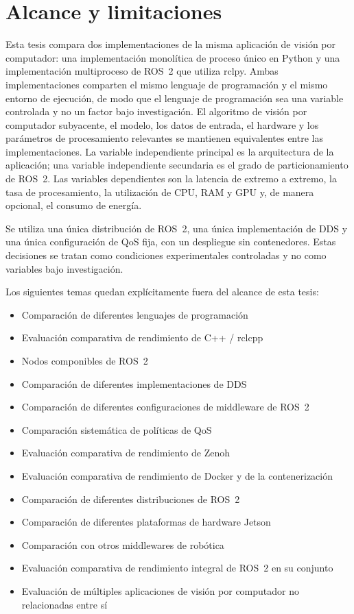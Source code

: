 \section{Alcance y limitaciones}
\label{sec:scope}

Esta tesis compara dos implementaciones de la misma aplicación de visión
por computador: una implementación monolítica de proceso único en Python y
una implementación multiproceso de ROS~2 que utiliza rclpy. Ambas
implementaciones comparten el mismo lenguaje de programación y el mismo
entorno de ejecución, de modo que el lenguaje de programación sea una
variable controlada y no un factor bajo investigación. El algoritmo de
visión por computador subyacente, el modelo, los datos de entrada, el
hardware y los parámetros de procesamiento relevantes se mantienen
equivalentes entre las implementaciones. La variable independiente principal
es la arquitectura de la aplicación; una variable independiente secundaria
es el grado de particionamiento de ROS~2. Las variables dependientes son la
latencia de extremo a extremo, la tasa de procesamiento, la utilización de
CPU, RAM y GPU y, de manera opcional, el consumo de energía.

Se utiliza una única distribución de ROS~2, una única implementación de DDS
y una única configuración de QoS fija, con un despliegue sin contenedores.
Estas decisiones se tratan como condiciones experimentales controladas y no
como variables bajo investigación.

Los siguientes temas quedan explícitamente fuera del alcance de esta tesis:

\begin{itemize}
  \item Comparación de diferentes lenguajes de programación
  \item Evaluación comparativa de rendimiento de C++ / rclcpp
  \item Nodos componibles de ROS~2
  \item Comparación de diferentes implementaciones de DDS
  \item Comparación de diferentes configuraciones de middleware de ROS~2
  \item Comparación sistemática de políticas de QoS
  \item Evaluación comparativa de rendimiento de Zenoh
  \item Evaluación comparativa de rendimiento de Docker y de la
        contenerización
  \item Comparación de diferentes distribuciones de ROS~2
  \item Comparación de diferentes plataformas de hardware Jetson
  \item Comparación con otros middlewares de robótica
  \item Evaluación comparativa de rendimiento integral de ROS~2 en su
        conjunto
  \item Evaluación de múltiples aplicaciones de visión por computador no
        relacionadas entre sí
\end{itemize}

